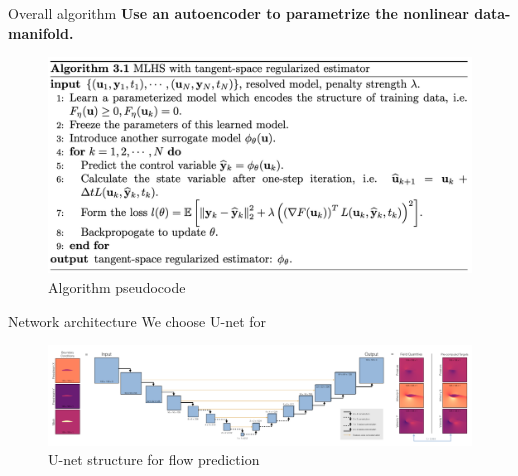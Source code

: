 \documentclass[NUS-Kajima workshop]{beamer}
\begin{document}
\begin{frame}{Overall algorithm}
	\textbf{Use an autoencoder to parametrize the nonlinear data-manifold.}
	\begin{figure}
		\centering
		\centerline{\includegraphics[width=\linewidth]{fig/alg.jpg}}
		\caption{Algorithm pseudocode}
	  \end{figure}
\end{frame}

\begin{frame}{Network architecture}
	We choose U-net for 
	\begin{figure}[H]
          \centering
          \centerline{\includegraphics[width=1.1\linewidth]{fig/Unet.png}}
          \caption{U-net structure for flow prediction\footnotemark}
\end{figure}
\end{frame}
\end{document}
